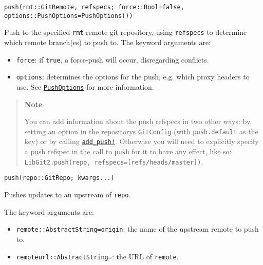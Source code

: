 \begin{adjustwidth}{2em}{0pt}


\begin{verbatim}
push(rmt::GitRemote, refspecs; force::Bool=false, options::PushOptions=PushOptions())
\end{verbatim}

Push to the specified \texttt{rmt} remote git repository, using \texttt{refspecs} to determine which remote branch(es) to push to. The keyword arguments are:

\begin{itemize}
\item \texttt{force}: if \texttt{true}, a force-push will occur, disregarding conflicts.


\item \texttt{options}: determines the options for the push, e.g. which proxy headers to use. See \hyperlink{13899785564428555533}{\texttt{PushOptions}} for more information.

\end{itemize}
\begin{quote}
\textbf{Note}

You can add information about the push refspecs in two other ways: by setting an option in the repository{\textquotesingle}s \texttt{GitConfig} (with \texttt{push.default} as the key) or by calling \hyperlink{2424007891894294055}{\texttt{add\_push!}}. Otherwise you will need to explicitly specify a push refspec in the call to \texttt{push} for it to have any effect, like so: \texttt{LibGit2.push(repo, refspecs=[{\textquotedbl}refs/heads/master{\textquotedbl}])}.

\end{quote}



\begin{lstlisting}
push(repo::GitRepo; kwargs...)
\end{lstlisting}

Pushes updates to an upstream of \texttt{repo}.

The keyword arguments are:

\begin{itemize}
\item \texttt{remote::AbstractString={\textquotedbl}origin{\textquotedbl}}: the name of the upstream remote to push to.


\item \texttt{remoteurl::AbstractString={\textquotedbl}{\textquotedbl}}: the URL of \texttt{remote}.



\end{itemize}
\end{adjustwidth}
